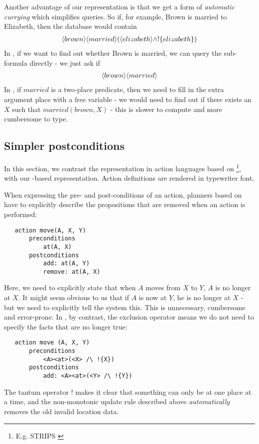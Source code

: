 Another advantage of our representation is that we get a form of \emph{automatic currying} which simplifies queries.
So if, for example, Brown is married to Elizabeth, then the database would contain 
\begin{eqnarray*}
\langle brown \rangle \langle married \rangle (\langle elizabeth \rangle \land ! \{elizabeth\})
\end{eqnarray*}
In \cathoristic{}, if we want to find out whether Brown is married, we can query the sub-formula directly -  we just ask if 
\begin{eqnarray*}
\langle brown \rangle \langle married \rangle \end{eqnarray*}
In \fol, if $married$ is a two-place predicate, then we need to fill in the extra argument place with a free variable - we would need to find out if there exists an $X$ such that $married(brown, X)$ - this is slower to compute and more cumbersome to type. 

\subsection{Simpler postconditions}

In this section, we contrast the representation in action languages based on \fol{}\footnote{E.g. STRIPS \cite{strips}}, with our \cathoristic{}-based representation.
Action definitions are rendered in typewriter font.

When expressing the pre- and post-conditions of an action, planners
based on \fol{} have to explicitly describe the propositions that
are removed when an action is performed:
\begin{verbatim}
   action move(A, X, Y)
       preconditions
           at(A, X)
       postconditions
           add: at(A, Y) 
           remove: at(A, X)
\end{verbatim}
Here, we need to explicitly state that when $A$ moves from $X$ to $Y$, $A$ is no longer at $X$. It might seem obvious to us that if $A$ is now at $Y$, he is no longer at $X$ - but we need to explicitly tell the system this. This is unnecessary, cumbersome and error-prone. In \cathoristic{}, by contrast, the exclusion operator means we do not need to specify the facts that are no longer true:
\begin{verbatim}
   action move (A, X, Y)
       preconditions
           <A><at>(<X> /\ !{X})
       postconditions
           add: <A><at>(<Y> /\ !{Y})
\end{verbatim}
The tantum operator $!$ makes it clear that something can only be at one
place at a time, and the non-monotonic update rule described above
\emph{automatically} removes the old invalid location data.

